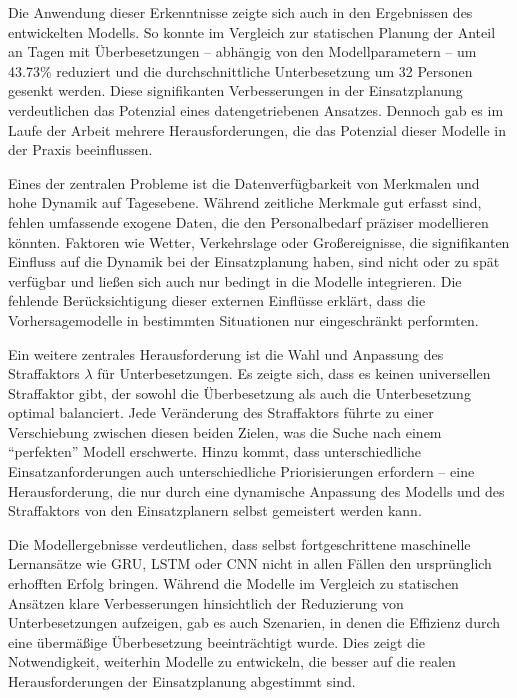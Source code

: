 \documentclass[%
pdftex,
oneside,			%
11pt,				%
parskip=half,		%
headheight = 12pt,	%
headsepline,		%
footsepline,		%
footheight = 16pt,	%
abstracton,		%
DIV=calc,		%
BCOR=8mm,		%
headinclude=false,	%
footinclude=false,	%
listof=totoc,		%
toc=bibliography,	%
]{scrreprt}	%
\begin{document}
        Die Anwendung dieser Erkenntnisse zeigte sich auch in den Ergebnissen des entwickelten Modells. 
        So konnte im Vergleich zur statischen Planung der Anteil an Tagen mit Überbesetzungen – abhängig von den Modellparametern – um 43.73\% reduziert und die durchschnittliche Unterbesetzung um 32 Personen gesenkt werden. 
        Diese signifikanten Verbesserungen in der Einsatzplanung verdeutlichen das Potenzial eines datengetriebenen Ansatzes. 
        Dennoch gab es im Laufe der Arbeit mehrere Herausforderungen, die das Potenzial dieser Modelle in der Praxis beeinflussen.

        Eines der zentralen Probleme ist die Datenverfügbarkeit von Merkmalen und hohe Dynamik auf Tagesebene. 
        Während zeitliche Merkmale gut erfasst sind, fehlen umfassende exogene Daten, die den Personalbedarf präziser modellieren könnten. 
        Faktoren wie Wetter, Verkehrslage oder Großereignisse, die signifikanten Einfluss auf die Dynamik bei der Einsatzplanung haben, sind nicht oder zu spät verfügbar und ließen sich auch nur bedingt in die Modelle integrieren. 
        Die fehlende Berücksichtigung dieser externen Einflüsse erklärt, dass die Vorhersagemodelle in bestimmten Situationen nur eingeschränkt performten.
        
        Ein weitere zentrales Herausforderung ist die Wahl und Anpassung des Straffaktors \( \lambda \) für Unterbesetzungen. 
        Es zeigte sich, dass es keinen universellen Straffaktor gibt, der sowohl die Überbesetzung als auch die Unterbesetzung optimal balanciert. 
        Jede Veränderung des Straffaktors führte zu einer Verschiebung zwischen diesen beiden Zielen, was die Suche nach einem \enquote{perfekten} Modell erschwerte. 
        Hinzu kommt, dass unterschiedliche Einsatzanforderungen auch unterschiedliche Priorisierungen erfordern – eine Herausforderung, die nur durch eine dynamische Anpassung des Modells und des Straffaktors von den Einsatzplanern selbst gemeistert werden kann.
        
        Die Modellergebnisse verdeutlichen, dass selbst fortgeschrittene maschinelle Lernansätze wie GRU, LSTM oder CNN nicht in allen Fällen den ursprünglich erhofften Erfolg bringen. 
        Während die Modelle im Vergleich zu statischen Ansätzen klare Verbesserungen hinsichtlich der Reduzierung von Unterbesetzungen aufzeigen, gab es auch Szenarien, in denen die Effizienz durch eine übermäßige Überbesetzung beeinträchtigt wurde. 
        Dies zeigt die Notwendigkeit, weiterhin Modelle zu entwickeln, die besser auf die realen Herausforderungen der Einsatzplanung abgestimmt sind.
        
\end{document}
